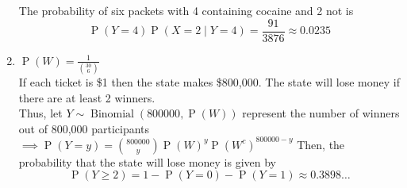 \documentclass{article}
\newcommand{\pr}[1]{\operatorname{P}(#1)}
\newcommand{\binomdist}[3]{#1 \sim \operatorname{Binomial}(#2, #3)}
\newcommand{\geodist}[2]{#1 \sim \operatorname{Geometric}(#2)}
\begin{document}
\begin{enumerate}
  The probability of six packets with 4 containing cocaine and 2 not is
  \[
    \pr{Y = 4}\pr{X = 2 \mid Y = 4} = \frac{91}{3876} \approx 0.0235
  \]
  \item $\pr{W} = \frac{1}{\binom{30}{6}}$\\
  If each ticket is \$1 then the state makes \$800,000.
  The state will lose money if there are at least 2 winners.\\
  Thus, let $\binomdist{Y}{800000}{\pr{W}}$
  represent the number of winners out of 800,000 participants\\
  $\implies \pr{Y=y} = \binom{800000}{y}\pr{W}^y\pr{W^c}^{800000-y}$
  Then, the probability that the state will lose money is given by
  \[
    \pr{Y\geq 2} = 1 - \pr{Y=0} - \pr{Y=1} \approx 0.3898\ldots
  \]
\end{enumerate}
\end{document}
